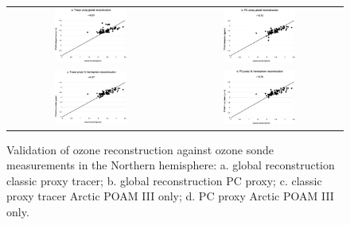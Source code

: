 \begin{figure}
  \centering
  \begin{tabular}{cc}
  \includegraphics[width=0.45\textwidth]{global_classic_sonde_Nhemi} &
  \includegraphics[width=0.45\textwidth]{global_PC_sonde_Nhemi} \\
  \includegraphics[width=0.45\textwidth]{Nhemi_classic_sonde} &
  \includegraphics[width=0.45\textwidth]{Nhemi_PC_sonde}
  \end{tabular}
  \caption{Validation of ozone reconstruction against ozone sonde measurements
  in the Northern hemisphere: a. global reconstruction classic proxy tracer; b. global reconstruction PC proxy; c. classic proxy tracer Arctic POAM III only; d. PC proxy Arctic POAM III only.}
  \label{Nhemi}
\end{figure}

